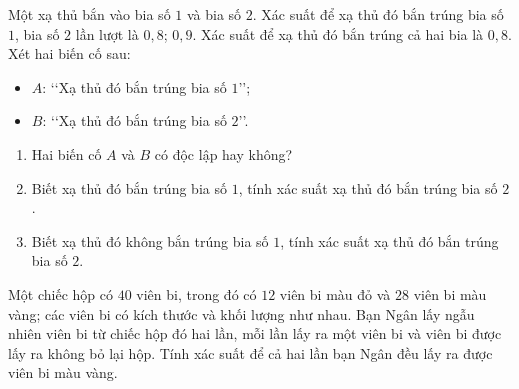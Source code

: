 \begin{bt}
	Một xạ thủ bắn vào bia số $1$ và bia số $2$. Xác suất để xạ thủ đó bắn trúng bia số $1$, bia số $2$ lần lượt là $0{,}8$; $0{,}9$. Xác suất để xạ thủ đó bắn trúng cả hai bia là $0{,}8$. Xét hai biến cố sau:
	\begin{itemize}
	\item $A$: \lq\lq  Xạ thủ đó bắn trúng bia số $1$\rq\rq;
	\item $B$: \lq\lq  Xạ thủ đó bắn trúng bia số $2$\rq\rq.
	\end{itemize}
	\begin{enumerate}
	\item Hai biến cố $A$ và $B$ có độc lập hay không?
	\item Biết xạ thủ đó bắn trúng bia số $1$, tính xác suất xạ thủ đó bắn trúng bia số $2$.
	\item Biết xạ thủ đó không bắn trúng bia số $1$, tính xác suất xạ thủ đó bắn trúng bia số $2$.
	\end{enumerate}
\end{bt}

\begin{bt}
	Một chiếc hộp có $40$ viên bi, trong đó có $12$ viên bi màu đỏ và $28$ viên bi màu vàng; các viên bi có kích thước và khối lượng như nhau. Bạn Ngân lấy ngẫu nhiên viên bi từ chiếc hộp đó hai lần, mỗi lần lấy ra một viên bi và viên bi được lấy ra không bỏ lại hộp. Tính xác suất để cả hai lần bạn Ngân đều lấy ra được viên bi màu vàng.
\end{bt}

